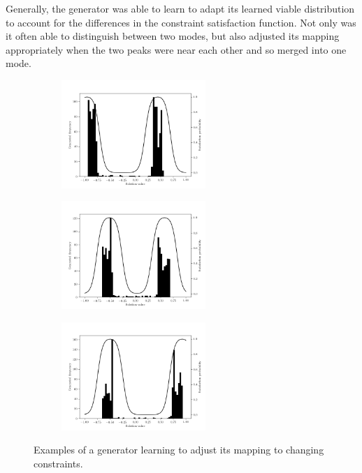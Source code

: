\documentclass[../../main.tex]{subfiles}
\begin{document}
Generally, the generator was able to learn to adapt its learned viable distribution to account for the differences in the constraint satisfaction function.
Not only was it often able to distinguish between two modes, but also adjusted its mapping appropriately when the two peaks were near each other and so merged into one mode.
\begin{figure}[H]
    \centering
    \begin{subfigure}[a]{1.\textwidth}
        \centering
        \includegraphics[width=0.6\textwidth]{embeddedConstraint1}
    \end{subfigure}
    \begin{subfigure}[a]{1.\textwidth}
        \centering
        \includegraphics[width=0.6\textwidth]{embeddedConstraint2}
    \end{subfigure}
    \begin{subfigure}[a]{1.\textwidth}
        \centering
        \includegraphics[width=0.6\textwidth]{embeddedConstraint5}
    \end{subfigure}
    \caption{
        Examples of a generator learning to adjust its mapping to changing constraints.
    }
\label{fig:embeddedConstraintsBimodal}
\end{figure}
\end{document}
